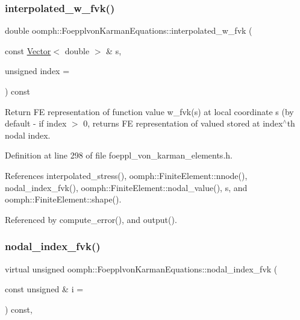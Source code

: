 \subsubsection{\texorpdfstring{interpolated\+\_\+w\+\_\+fvk()}{interpolated\_w\_fvk()}}
{\footnotesize\ttfamily double oomph\+::\+Foepplvon\+Karman\+Equations\+::interpolated\+\_\+w\+\_\+fvk (\begin{DoxyParamCaption}\item[{const \hyperlink{classoomph_1_1Vector}{Vector}$<$ double $>$ \&}]{s,  }\item[{unsigned}]{index = {} }\end{DoxyParamCaption}) const\hspace{0.3cm}{\ttfamily [inline]}}



Return FE representation of function value w\+\_\+fvk(s) at local coordinate s (by default -\/ if index $>$ 0, returns FE representation of valued stored at index$^\wedge$th nodal index. 



Definition at line 298 of file foeppl\+\_\+von\+\_\+karman\+\_\+elements.\+h.



References interpolated\+\_\+stress(), oomph\+::\+Finite\+Element\+::nnode(), nodal\+\_\+index\+\_\+fvk(), oomph\+::\+Finite\+Element\+::nodal\+\_\+value(), s, and oomph\+::\+Finite\+Element\+::shape().



Referenced by compute\+\_\+error(), and output().

\mbox{\label{classoomph_1_1FoepplvonKarmanEquations_a95dc0adb56100493104ba426fa3daa04}} 
\subsubsection{\texorpdfstring{nodal\+\_\+index\+\_\+fvk()}{nodal\_index\_fvk()}}
{\footnotesize\ttfamily virtual unsigned oomph\+::\+Foepplvon\+Karman\+Equations\+::nodal\+\_\+index\+\_\+fvk (\begin{DoxyParamCaption}\item[{const unsigned \&}]{i = {} }\end{DoxyParamCaption}) const\hspace{0.3cm}{\ttfamily [inline]}, {\ttfamily [virtual]}}



